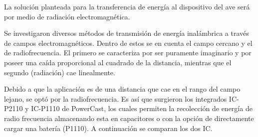 La solución planteada para la transferencia de energía al dispositivo del ave será por medio de radiación electromagnética. 


Se investigaron diversos métodos de transmisión de energía inalámbrica a través de campos electromagnéticos. Dentro de estos se en cuenta el campo cercano y el de radiofrecuencia. El primero se caracteriza por ser puramente imaginario y por poseer una caída proporcional al cuadrado de la distancia, mientras que el segundo (radiación) cae linealmente.

Debido a que la aplicación es de una distancia que cae en el rango del campo lejano, se optó por la radiofrecuencia. Es así que surgieron los integrados IC-P2110 y IC-P1110 de PowerCast, los cuales permiten la recolección de energía de radio frecuencia almacenando esta en capacitores o con la opción de directamente cargar una batería (P1110). A continuación se comparan los dos IC.

